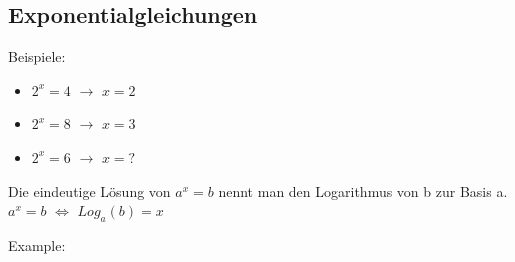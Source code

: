 \newpage
\subsection{Exponentialgleichungen}

\hfill \break
Beispiele:
\begin{itemize}
    \item $2^x = 4$ $\rightarrow$ $x = 2$
    \item $2^x = 8$ $\rightarrow$ $x = 3$
    \item $2^x = 6$ $\rightarrow$ $x = ?$
\end{itemize}

\hfill \break
Die eindeutige Lösung von $a^x = b$ nennt man den Logarithmus von b zur Basis a.\\
$a^x = b$ $\Leftrightarrow$ $Log_a(b) = x$


\hfill \break
Example:\\
\fboxrule=0.8pt 